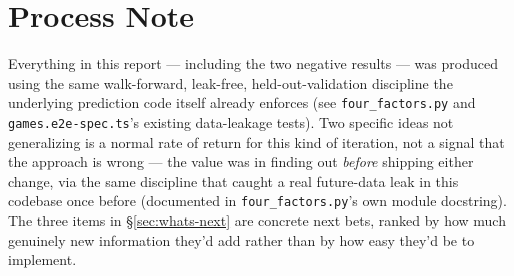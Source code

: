 \documentclass[11pt]{article}
\newcommand{\code}[1]{\allowbreak\texttt{\small #1}\allowbreak}
\begin{document}
\section{Process Note}

Everything in this report — including the two negative results — was produced using the same walk-forward,
leak-free, held-out-validation discipline the underlying prediction code itself already enforces (see
\code{four\_factors.py} and \code{games.e2e-spec.ts}'s existing data-leakage tests). Two specific ideas not
generalizing is a normal rate of return for this kind of iteration, not a signal that the approach is wrong
— the value was in finding out \emph{before} shipping either change, via the same discipline that caught a
real future-data leak in this codebase once before (documented in \code{four\_factors.py}'s own module
docstring). The three items in \S\ref{sec:whats-next} are concrete next bets, ranked by how much genuinely
new information they'd add rather than by how easy they'd be to implement.
\end{document}
